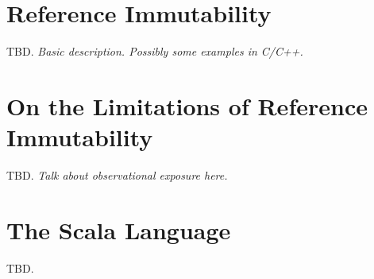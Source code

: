 
\section{Reference Immutability}

TBD. {\em Basic description. Possibly some examples in C/C++.}


\section{On the Limitations of Reference Immutability}

TBD. {\em Talk about observational exposure here.}

\section{The Scala Language}

TBD.
